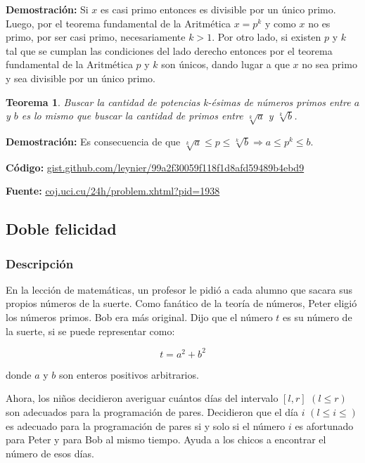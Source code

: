 \documentclass[12pt]{article}
\newcommand{\proof}{\textbf{Demostración:} }
\newcommand{\nl}{\vspace{0.3cm}}
\newtheorem{theorem}{Teorema}
\begin{document}
\newpage

\proof Si $x$ es casi primo entonces es divisible por un único primo. Luego, por el teorema fundamental de la Aritmética $x = p^k$ y como $x$ no es primo, por ser casi primo, necesariamente $k > 1$. Por otro lado, si existen $p$ y $k$ tal que se cumplan las condiciones del lado derecho entonces por el teorema fundamental de la Aritmética $p$ y $k$ son únicos, dando lugar a que $x$ no sea primo y sea divisible por un único primo.

\begin{theorem}
	Buscar la cantidad de potencias k-ésimas de números primos entre $a$ y $b$ es lo mismo que buscar la cantidad de primos entre $\sqrt[k]{a}$ y $\sqrt[k]{b}$.
\end{theorem}

\proof Es consecuencia de que $\sqrt[k]{a} \leqslant p \leqslant \sqrt[k]{b} \Rightarrow a \leqslant p^k \leqslant b$.

\nl

\textbf{Código:} \href{https://gist.github.com/leynier/99a2f30059f118f1d8afd59489b4ebd9}{gist.github.com/leynier/99a2f30059f118f1d8afd59489b4ebd9}

\nl

\textbf{Fuente:} \href{http://coj.uci.cu/24h/problem.xhtml?pid=1938}{coj.uci.cu/24h/problem.xhtml?pid=1938}

\subsection{Doble felicidad}

\subsubsection{Descripción}

En la lección de matemáticas, un profesor le pidió a cada alumno que sacara sus propios números de la suerte. Como fanático de la teoría de números, Peter eligió los números primos. Bob era más original. Dijo que el número $t$ es su número de la suerte, si se puede representar como:

$$ t = a^2 + b^2 $$

donde $a$ y $b$ son enteros positivos arbitrarios.

\nl

Ahora, los niños decidieron averiguar cuántos días del intervalo $[l, r]$ $(l \leqslant r)$ son adecuados para la programación de pares. Decidieron que el día $i$ $(l \leqslant i \leqslant)$ es adecuado para la programación de pares si y solo si el número $i$ es afortunado para Peter y para Bob al mismo tiempo. Ayuda a los chicos a encontrar el número de esos días.
\end{document}
